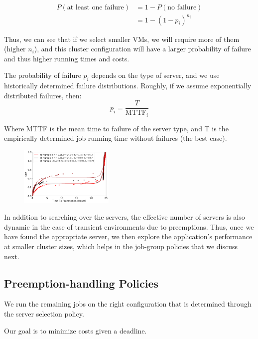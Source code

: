 \begin{align}
  \label{eq:pfail1}
  P(\text{at least one failure}) &= 1-P(\text{no failure}) \\
                                 &= 1-(1-p_i)^{n_i} 
\end{align}

Thus, we can see that if we select smaller VMs, we will require more of them (higher $n_i$), and this cluster configuration will have a larger probability of failure and thus higher running times and costs.

The probability of failure $p_i$ depends on the type of server, and we use historically determined failure distributions.
Roughly, if we assume exponentially distributed failures, then:
\begin{equation}
  \label{eq:pi}
  p_i = \dfrac{T}{\text{MTTF}_i}
\end{equation}

Where MTTF is the mean time to failure of the server type, and T is the empirically determined job running time without failures (the best case).

\begin{figure}
  \includegraphics[width=0.4\textwidth]{../graphs/cdf_comparison_3.pdf}
\end{figure}




In addition to searching over the servers, the effective number of servers is also dynamic in the case of transient environments due to preemptions.
Thus, once we have found the appropriate server, we then explore the application's performance at smaller cluster sizes, which helps in the job-group policies that we discuss next. 


\subsection{Preemption-handling Policies}

We run the remaining jobs on the right configuration that is determined through the server selection policy.

Our goal is to minimize costs given a deadline.


